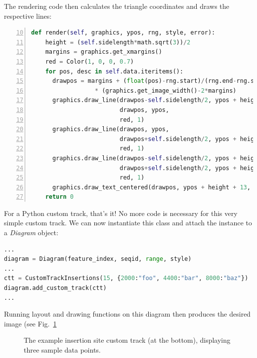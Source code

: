 \documentclass[a4paper]{scrreprt}
\begin{document}
The rendering code then calculates the triangle coordinates and draws the respective lines:

\begin{lstlisting}[language=Python, firstnumber=10, showstringspaces=false,numbers=left,frame=single]
  def render(self, graphics, ypos, rng, style, error):
    height = (self.sidelength*math.sqrt(3))/2
    margins = graphics.get_xmargins()
    red = Color(1, 0, 0, 0.7)
    for pos, desc in self.data.iteritems():
      drawpos = margins + (float(pos)-rng.start)/(rng.end-rng.start+1)         \
                  * (graphics.get_image_width()-2*margins)
      graphics.draw_line(drawpos-self.sidelength/2, ypos + height,             \
                         drawpos, ypos,                                        \
                         red, 1)
      graphics.draw_line(drawpos, ypos,                                        \
                         drawpos+self.sidelength/2, ypos + height,             \
                         red, 1)
      graphics.draw_line(drawpos-self.sidelength/2, ypos + height,             \
                         drawpos+self.sidelength/2, ypos + height,             \
                         red, 1)
      graphics.draw_text_centered(drawpos, ypos + height + 13, str(desc))
    return 0
\end{lstlisting}

For a Python custom track, that's it! No more code is necessary for this very simple custom track. We can now instantiate this class and attach the instance to a \emph{Diagram} object:

\begin{lstlisting}[language=Python, showstringspaces=false,numbers=none,frame=single]
...
diagram = Diagram(feature_index, seqid, range, style)
...
ctt = CustomTrackInsertions(15, {2000:"foo", 4400:"bar", 8000:"baz"})
diagram.add_custom_track(ctt)
...
\end{lstlisting}

Running layout and drawing functions on this diagram then produces the desired image (see Fig.~\ref{ctexample2}

\begin{figure}[ht]
\caption{The example insertion site custom track (at the bottom), displaying three sample data points.}
\label{ctexample2}
\end{figure}
\end{document}

